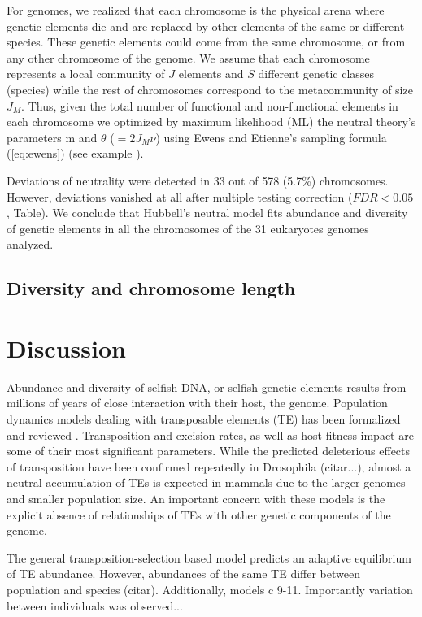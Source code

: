 For genomes, we realized that each chromosome is the physical arena where genetic elements die and are replaced by other elements of the same or different species. These genetic elements could come from the same chromosome, or from any other chromosome of the genome. We assume that each chromosome represents a local community of $J$ elements and $S$ different genetic classes (species) while the rest of chromosomes correspond to the metacommunity of size $J_M$. Thus, given the total number of functional and non-functional elements in each chromosome we optimized by maximum likelihood (ML) the neutral theory's parameters m and $\theta$ ($= 2 J_M\nu$) using Ewens and Etienne's sampling formula (\ref{eq:ewens}) (see example ).

Deviations of neutrality were detected in 33 out of 578 (5.7\%) chromosomes. However, deviations vanished at all after multiple testing correction ($FDR< 0.05$, Table). We conclude that Hubbell's neutral model fits abundance and diversity of genetic elements in all the chromosomes of the 31 eukaryotes genomes analyzed. 


\subsection{Diversity and chromosome length}

\section{Discussion}

Abundance and diversity of \gls{selfish DNA}, or selfish genetic elements \cite{Doolittle1980,Orgel1980} results from millions of years of close interaction with their host, the genome. Population dynamics models dealing with transposable elements (TE) has been formalized and reviewed \cite{Charlesworth2009,Charlesworth1994,LeRouzic2005}. Transposition and excision rates, as well as host fitness impact are some of their most significant parameters. While the predicted deleterious effects of transposition have been confirmed repeatedly in Drosophila (citar...), almost a neutral accumulation of TEs is expected in mammals due to the larger genomes and smaller population size\cite{Lynch2003}. An important concern with these models is the explicit absence of relationships of TEs with other genetic components of the genome. 

The general transposition-selection based model predicts an adaptive equilibrium of TE abundance. However, abundances of the same TE differ between population and species (citar). 
Additionally, models c 9-11. Importantly variation between individuals was observed...\cite{Brookfield2005}

